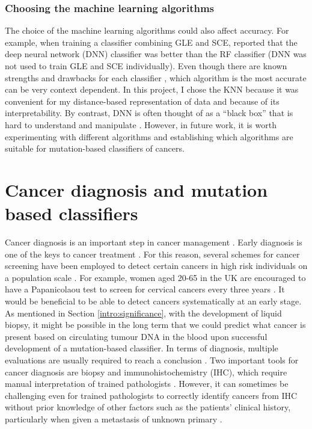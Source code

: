 

\subsubsection{Choosing the machine learning algorithms}
The choice of the machine learning algorithms could also affect accuracy. For example, when training a classifier combining GLE and SCE, \citet{Jiao2020} reported that the deep neural network (DNN) classifier was better than the RF classifier (DNN was not used to train GLE and SCE individually). Even though there are known strengths and drawbacks for each classifier \citep{Susmita2019AAlgorithms}, which algorithm is the most accurate can be very context dependent. In this project, I chose the KNN because it was convenient for my distance-based representation of data and because of its interpretability. By contrast, DNN is often thought of as a ``black box'' that is hard to understand and manipulate \citep{Shwartz-Ziv2017OpeningInformation}. However, in future work, it is worth experimenting with different algorithms and establishing which algorithms are suitable for mutation-based classifiers of cancers. 

\section{Cancer diagnosis and mutation based classifiers}\label{discussion:diagnosis}
Cancer diagnosis is an important step in cancer management \citep{Tobias2014CancerManagement}. Early diagnosis is one of the keys to cancer treatment \citep{Hawkes2019CancerDiagnosis}. For this reason, several schemes for cancer screening have been employed to detect certain cancers in high risk individuals on a population scale \citep{Tobias2014CancerManagement}. For example, women aged 20-65 in the UK are encouraged to have a Papanicolaou test \citep{Bharadwaj2013HumanTreatment} to screen for cervical cancers every three years \citep{Tobias2014CancerManagement}. It would be beneficial to be able to detect cancers systematically at an early stage. As mentioned in Section \ref{intro:significance}, with the development of liquid biopsy, it might be possible in the long term that we could predict what cancer is present based on circulating tumour DNA in the blood upon successful development of a mutation-based classifier. In terms of diagnosis, multiple evaluations are usually required to reach a conclusion \citep{Tobias2014CancerManagement,Stone1995Biopsy:Pitfalls}. Two important tools for cancer diagnosis are biopsy and immunohistochemistry (IHC), which require manual interpretation of trained pathologists \citep{Stone1995Biopsy:Pitfalls,Ahmed200615Cancer}. However, it can sometimes be challenging even for trained pathologists to correctly identify cancers from IHC without prior knowledge of other factors such as the patients' clinical history, particularly when given a \gls{metastasis} of unknown primary \citep{Sheahan1993MetastaticStatus,Rassy2020ExploringToday}.  

